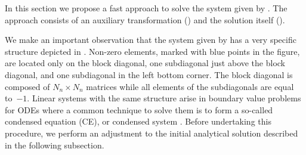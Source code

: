 In this section we propose a fast approach to solve the system given by . The approach consists of an auxiliary transformation () and the solution itself ().

We make an important observation that the system given by  has a very specific structure depicted in . Non-zero elements, marked with blue points in the figure, are located only on the block diagonal, one subdiagonal just above the block diagonal, and one subdiagonal in the left bottom corner. The block diagonal is composed of $N_n \times N_n$ matrices while all elements of the subdiagonals are equal \mbox{to $-1$}. Linear systems with the same structure arise in boundary value problems for ODEs where a common technique to solve them is to form a so-called condensed equation (CE), or condensed system \cite{stoer2002}. Before undertaking this procedure, we perform an adjustment to the initial analytical solution described in the following subsection.


